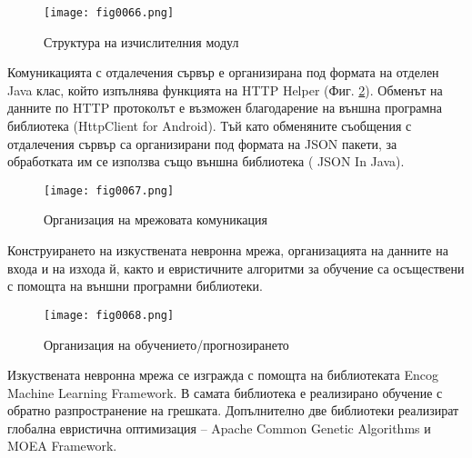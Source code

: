 \begin{figure}[H]
  \centering
  \texttt{[image: fig0066.png]}
  \caption{Структура на изчислителния модул}
\label{fig0066}
\end{figure}

Комуникацията с отдалечения сървър е организирана под формата на отделен Java клас, който изпълнява функцията на HTTP Helper (Фиг. \ref{fig0067}). Обменът на данните по HTTP протоколът е възможен благодарение на външна програмна библиотека (HttpClient for Android). Тъй като обменяните съобщения с отдалечения сървър са организирани под формата на JSON пакети, за обработката им се използва също външна библиотека (
JSON In Java).

\begin{figure}[H]
  \centering
  \texttt{[image: fig0067.png]}
  \caption{Организация на мрежовата комуникация}
\label{fig0067}
\end{figure}

Конструирането на изкуствената невронна мрежа, организацията на данните на входа и на изхода й, както и евристичните алгоритми за обучение са осъществени с помощта на външни програмни библиотеки. 

\begin{figure}[H]
  \centering
  \texttt{[image: fig0068.png]}
  \caption{Организация на обучението/прогнозирането}
\label{fig0068}
\end{figure}

Изкуствената невронна мрежа се изгражда с помощта на библиотеката Encog Machine Learning Framework. В самата библиотека е реализирано обучение с обратно разпространение на грешката. Допълнително две библиотеки реализират глобална евристична оптимизация – Apache Common Genetic Algorithms и MOEA Framework.


